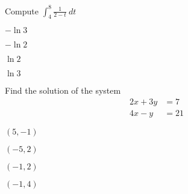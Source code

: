 \begin{readinessAssuranceTest}
\item
Compute \(\int _4 ^8 \frac{1}{2-t}\ dt\)
\begin{multicols}{4}
\begin{readinessAssuranceTestChoices}
\item  \(-\ln 3\) %
\item  \(-\ln 2\) %
\item  \(\ln 2\) %
\item  \(\ln 3\) %
\end{readinessAssuranceTestChoices}
\end{multicols}

\item 
Find the solution of the system
\begin{alignat*}
2x+3y&=7\\
4x-y &= 21
\end{alignat*}
\begin{multicols}{4}
\begin{readinessAssuranceTestChoices}
\item  \((5,-1)\) %
\item  \((-5,2)\) 
\item  \((-1,2)\)
\item  \((-1,4)\) 
\end{readinessAssuranceTestChoices}
\end{multicols}


\end{readinessAssuranceTest}
